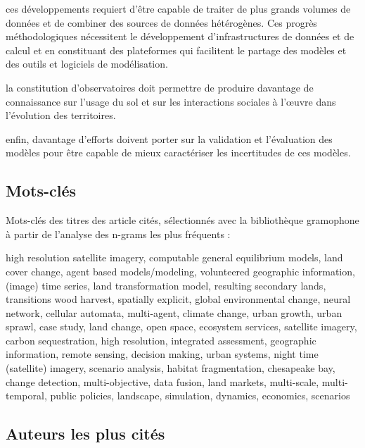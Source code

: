 \item ces développements requiert d’être capable de traiter de plus grands
volumes de données et de combiner des sources de données hétérogènes. Ces
progrès méthodologiques nécessitent le développement d’infrastructures de
données et de calcul et en constituant des plateformes qui facilitent le
partage des modèles et des outils et logiciels de modélisation.

\item la constitution d’observatoires doit permettre de produire davantage de
connaissance sur l’usage du sol et sur les interactions sociales à l’œuvre
dans l’évolution des territoires.

\item enfin, davantage d’efforts doivent porter
sur la validation et l’évaluation des modèles pour être capable de mieux
caractériser les incertitudes de ces modèles.

\subsection{Mots-clés}

Mots-clés des titres des article cités, sélectionnés avec la bibliothèque gramophone à partir de l’analyse des n-grams les plus fréquents :

high resolution satellite imagery, computable general equilibrium models, land
cover change, agent based models/modeling, volunteered geographic information,
(image) time series, land transformation model, resulting secondary lands,
transitions wood harvest, spatially explicit, global environmental change,
neural network, cellular automata, multi-agent, climate change, urban growth,
urban sprawl, case study, land change, open space, ecosystem services,
satellite imagery, carbon sequestration, high resolution, integrated
assessment, geographic information, remote sensing, decision making, urban
systems, night time (satellite) imagery, scenario analysis, habitat
fragmentation, chesapeake bay, change detection, multi-objective, data fusion,
land markets, multi-scale, multi-temporal, public policies, landscape,
simulation, dynamics, economics, scenarios

\subsection
{Auteurs les plus cités}

\startcolumns[n=3]
\startitemize[n,packed]

